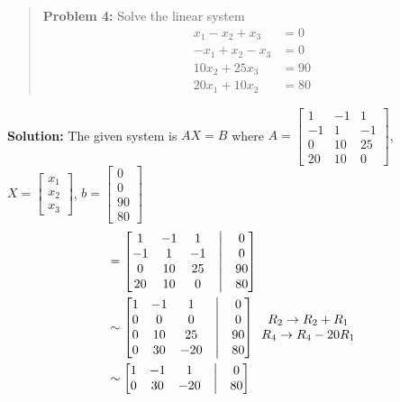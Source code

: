 \documentclass[
  letterpaper,
  DIV=11,
  numbers=noendperiod]{scrreprt}
\begin{document}
\begin{quote}
\textbf{Problem 4:} Solve the linear system \begin{align*}
x_1-x_2+x_3 &=0\\
-x_1+x_2-x_3 &=0\\
10x_2+25x_3 &= 90\\
20x_1+10x_2 &= 80
\end{align*}
\end{quote}

\textbf{Solution:} The given system is \(AX=B\) where
\(A=\begin{bmatrix}
    1 &-1 &1\\
    -1 &1 &-1\\
    0 &10 &25\\
    20 &10 &0
\end{bmatrix}\), \(X=\begin{bmatrix}
    x_1\\
    x_2\\
    x_3
\end{bmatrix}\), \(b=\begin{bmatrix}
    0\\
    0\\
    90\\
    80
\end{bmatrix}\) \begin{align*}
    [A|b]&=\begin{bmatrix}
        1 &-1  &1 &\bigm| &0\\
        -1 &1 &-1 &\bigm| &0\\
        0 &10 &25 &\bigm| &90\\
        20 &10 &0 &\bigm| &80
    \end{bmatrix}\\
    &\sim \begin{bmatrix}
        1 &-1  &1 &\bigm| &0\\
        0 &0 &0 &\bigm| &0\\
        0 &10 &25 &\bigm| &90\\
        0 &30 &-20 &\bigm| &80
    \end{bmatrix}\begin{array}{c}
        R_2\rightarrow R_2+R_1\\
        R_4\rightarrow R_4-20R_1
    \end{array}\\
    &\sim \begin{bmatrix}
    1 &-1  &1 &\bigm| &0\\
    0 &30 &-20 &\bigm| &80\\

\end{bmatrix}
\end{align*}
\end{document}
